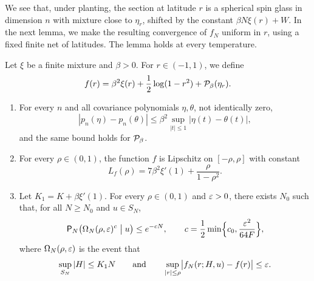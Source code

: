 We see that, under planting, the section at latitude $r$ is a spherical spin glass in dimension $n$ with mixture close to $\eta_r$, shifted by the constant $\beta N\xi(r)+W$. In the next lemma, we make the resulting convergence of $f_N$ uniform in $r$, using a fixed finite net of latitudes. The lemma holds at every temperature.

\begin{lemma}\label{lem:pr-latitude}
Let $\xi$ be a finite mixture and $\beta>0$. For $r\in(-1,1)$, we define
\begin{equation}\label{eq:pr-f}
f(r)=\beta^2\xi(r)+\frac12\log(1-r^2)+\mathcal P_\beta(\eta_r).
\end{equation}
\begin{enumerate}
\item[(a)] For every $n$ and all covariance polynomials $\eta,\theta$, not identically zero,
\[
|p_n(\eta)-p_n(\theta)|\le\beta^2\sup_{|t|\le1}|\eta(t)-\theta(t)|,
\]
and the same bound holds for $\mathcal P_\beta$.
\item[(b)] For every $\rho\in(0,1)$, the function $f$ is Lipschitz on $[-\rho,\rho]$ with constant
\[
L_f(\rho)=7\beta^2\xi'(1)+\frac{\rho}{1-\rho^2}.
\]
\item[(c)] Let $K_1=K+\beta\xi'(1)$. For every $\rho\in(0,1)$ and $\varepsilon>0$, there exists $N_0$ such that, for all $N\ge N_0$ and $u\in S_N$,
\[
\mathsf P_N\bigl(\Omega_N(\rho,\varepsilon)^c\bigm| u\bigr)\le e^{-cN},\qquad c=\frac12\min\Bigl\{c_0,\frac{\varepsilon^2}{64F}\Bigr\},
\]
where $\Omega_N(\rho,\varepsilon)$ is the event that
\[
\sup_{S_N}|H|\le K_1N\qquad\text{and}\qquad\sup_{|r|\le\rho}\bigl|f_N(r;H,u)-f(r)\bigr|\le\varepsilon .
\]
\end{enumerate}
\end{lemma}

